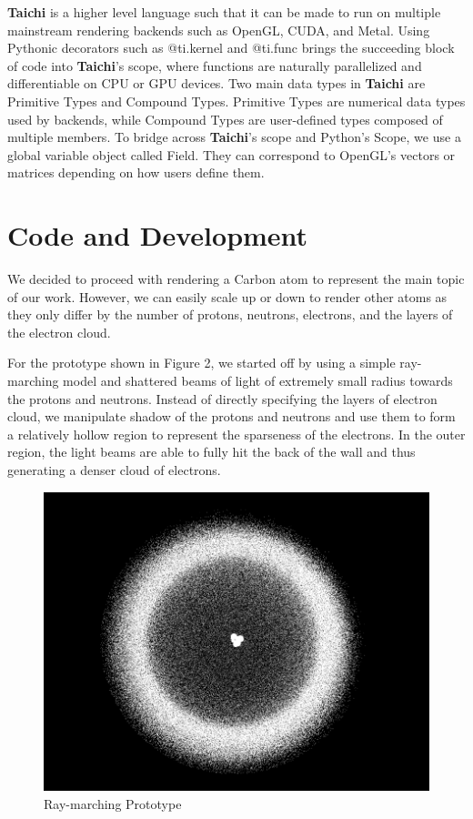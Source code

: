 \documentclass[acmtog]{acmart}
\begin{document}
\textbf{Taichi} is a higher level language such that it can be made to run on multiple mainstream rendering backends such as OpenGL, CUDA, and Metal. Using Pythonic decorators such as @ti.kernel and @ti.func brings the succeeding block of code into \textbf{Taichi}'s scope, where functions are naturally parallelized and differentiable on CPU or GPU devices. Two main data types in \textbf{Taichi} are Primitive Types and Compound Types. Primitive Types are numerical data types used by backends, while Compound Types are user-defined types composed of multiple members. To bridge across \textbf{Taichi}'s scope and Python's Scope, we use a global variable object called Field. They can correspond to OpenGL's vectors or matrices depending on how users define them.

\section{Code and Development}
We decided to proceed with rendering a Carbon atom to represent the main topic of our work. However, we can easily scale up or down to render other atoms as they only differ by the number of protons, neutrons, electrons, and the layers of the electron cloud. 

For the prototype shown in Figure 2, we started off by using a simple ray-marching model and shattered beams of light of extremely small radius towards the protons and neutrons. Instead of directly specifying the layers of electron cloud, we manipulate shadow of the protons and neutrons and use them to form a relatively hollow region to represent the sparseness of the electrons. In the outer region, the light beams are able to fully hit the back of the wall and thus generating a denser cloud of electrons.

\begin{figure}[h]
  \centering
  \includegraphics[width=\linewidth]{./prototype.png}
  \caption{Ray-marching Prototype}
\end{figure}
\end{document}
